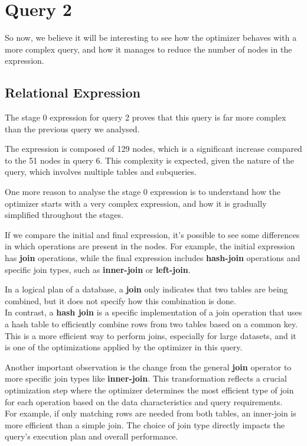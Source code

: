 \documentclass[a4paper,12pt]{scrreprt}
\begin{document}
\section{Query 2}

So now, we believe it will be interesting to see how the optimizer behaves with a more complex query, and how it manages to reduce the number of nodes in the expression. 

\subsection{Relational Expression}

The stage 0 expression for query 2 proves that this query is far more complex than the previous query we analysed.

The expression is composed of 129 nodes, which is a significant increase compared to the 51 nodes in query 6. This complexity is expected, given the nature of the query, which involves multiple tables and subqueries. 

One more reason to analyse the stage 0 expression is to understand how the optimizer starts with a very complex expression, and how it is gradually simplified throughout the stages. 

If we compare the initial and final expression, it's possible to see some differences in which operations are present in the nodes. For example, the initial expression has \textbf{join} operations, while the final expression includes \textbf{hash-join} operations and specific join types, such as \textbf{inner-join} or \textbf{left-join}.

In a logical plan of a database, a \textbf{join} only indicates that two tables are being combined, but it does not specify how this combination is done. \\
In contrast, a \textbf{hash join} is a specific implementation of a join operation that uses a hash table to efficiently combine rows from two tables based on a common key. This is a more efficient way to perform joins, especially for large datasets, and it is one of the optimizations applied by the optimizer in this query. 

Another important observation is the change from the general \textbf{join} operator to more specific join types like \textbf{inner-join}. This transformation reflects a crucial optimization step where the optimizer determines the most efficient type of join for each operation based on the data characteristics and query requirements. \\
For example, if only matching rows are needed from both tables, an inner-join is more efficient than a simple join. The choice of join type directly impacts the query's execution plan and overall performance.
\end{document}
